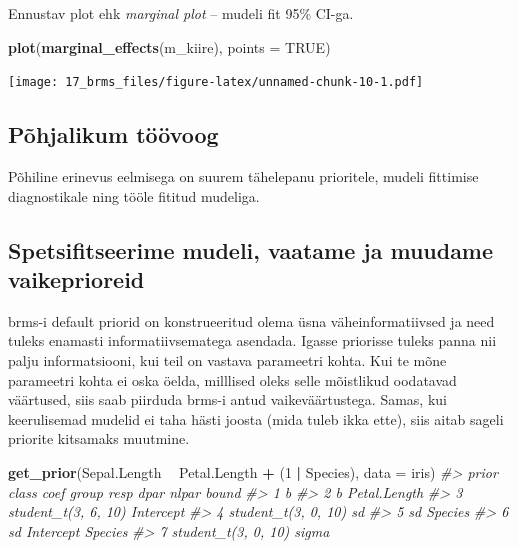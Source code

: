 \documentclass[]{book}
\newenvironment{Shaded}{\begin{snugshade}}{\end{snugshade}}
\newcommand{\CommentTok}[1]{\textcolor[rgb]{0.56,0.35,0.01}{\textit{#1}}}
\newcommand{\DataTypeTok}[1]{\textcolor[rgb]{0.13,0.29,0.53}{#1}}
\newcommand{\DecValTok}[1]{\textcolor[rgb]{0.00,0.00,0.81}{#1}}
\newcommand{\KeywordTok}[1]{\textcolor[rgb]{0.13,0.29,0.53}{\textbf{#1}}}
\newcommand{\NormalTok}[1]{#1}
\newcommand{\OperatorTok}[1]{\textcolor[rgb]{0.81,0.36,0.00}{\textbf{#1}}}
\newcommand{\OtherTok}[1]{\textcolor[rgb]{0.56,0.35,0.01}{#1}}
\newcommand{\StringTok}[1]{\textcolor[rgb]{0.31,0.60,0.02}{#1}}
\begin{document}
Ennustav plot ehk \emph{marginal plot} -- mudeli fit 95\% CI-ga.

\begin{Shaded}
\begin{Highlighting}[]
\KeywordTok{plot}\NormalTok{(}\KeywordTok{marginal_effects}\NormalTok{(m_kiire), }\DataTypeTok{points =} \OtherTok{TRUE}\NormalTok{)}
\end{Highlighting}
\end{Shaded}

\texttt{[image: 17\_brms\_files/figure-latex/unnamed-chunk-10-1.pdf]}

\hypertarget{pohjalikum-toovoog}{%
\subsection{Põhjalikum töövoog}\label{pohjalikum-toovoog}}

Põhiline erinevus eelmisega on suurem tähelepanu prioritele, mudeli fittimise diagnostikale ning tööle fititud mudeliga.

\hypertarget{spetsifitseerime-mudeli-vaatame-ja-muudame-vaikeprioreid}{%
\subsection{Spetsifitseerime mudeli, vaatame ja muudame vaikeprioreid}\label{spetsifitseerime-mudeli-vaatame-ja-muudame-vaikeprioreid}}

brms-i default priorid on konstrueeritud olema üsna väheinformatiivsed ja need tuleks enamasti informatiivsematega asendada. Igasse priorisse tuleks panna nii palju informatsiooni, kui teil on vastava parameetri kohta. Kui te mõne parameetri kohta ei oska öelda, milllised oleks selle mõistlikud oodatavad väärtused, siis saab piirduda brms-i antud vaikeväärtustega. Samas, kui keerulisemad mudelid ei taha hästi joosta (mida tuleb ikka ette), siis aitab sageli priorite kitsamaks muutmine.

\begin{Shaded}
\begin{Highlighting}[]
\KeywordTok{get_prior}\NormalTok{(Sepal.Length }\OperatorTok{~}\StringTok{ }\NormalTok{Petal.Length }\OperatorTok{+}\StringTok{ }\NormalTok{(}\DecValTok{1} \OperatorTok{|}\StringTok{ }\NormalTok{Species), }
          \DataTypeTok{data =}\NormalTok{ iris)}
\CommentTok{#>                 prior     class         coef   group resp dpar nlpar bound}
\CommentTok{#> 1                             b                                           }
\CommentTok{#> 2                             b Petal.Length                              }
\CommentTok{#> 3 student_t(3, 6, 10) Intercept                                           }
\CommentTok{#> 4 student_t(3, 0, 10)        sd                                           }
\CommentTok{#> 5                            sd              Species                      }
\CommentTok{#> 6                            sd    Intercept Species                      }
\CommentTok{#> 7 student_t(3, 0, 10)     sigma}
\end{Highlighting}
\end{Shaded}
\end{document}
